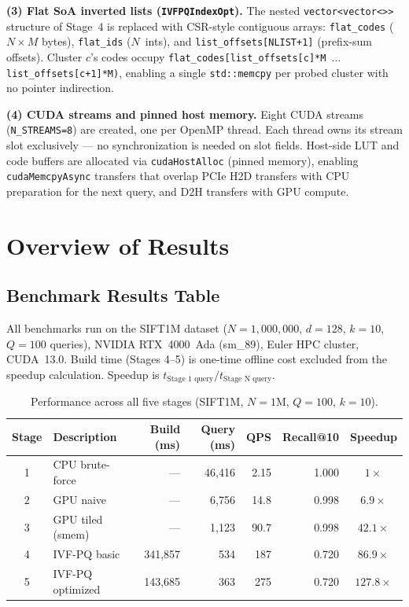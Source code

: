\documentclass[12pt]{article}
\newcommand{\code}[1]{\texttt{\small #1}}
\begin{document}
\textbf{(3) Flat SoA inverted lists (\code{IVFPQIndexOpt}).}
The nested \code{vector<vector<>>} structure of Stage~4 is replaced with
CSR-style contiguous arrays: \code{flat\_codes} ($N \times M$ bytes),
\code{flat\_ids} ($N$~ints), and \code{list\_offsets[NLIST+1]}
(prefix-sum offsets).
Cluster $c$'s codes occupy
\code{flat\_codes[list\_offsets[c]*M $\ldots$ list\_offsets[c+1]*M)},
enabling a single \code{std::memcpy} per probed cluster with no pointer
indirection.

\textbf{(4) CUDA streams and pinned host memory.}
Eight CUDA streams (\code{N\_STREAMS=8}) are created, one per OpenMP thread.
Each thread owns its stream slot exclusively --- no synchronization is needed
on slot fields.
Host-side LUT and code buffers are allocated via \code{cudaHostAlloc}
(pinned memory), enabling \code{cudaMemcpyAsync} transfers that overlap
PCIe H2D transfers with CPU preparation for the next query, and D2H transfers
with GPU compute.

\section{Overview of Results}

\subsection{Benchmark Results Table}

All benchmarks run on the SIFT1M dataset ($N{=}1{,}000{,}000$, $d{=}128$,
$k{=}10$, $Q{=}100$ queries), NVIDIA RTX~4000~Ada (sm\_89), Euler HPC cluster,
CUDA~13.0. Build time (Stages 4--5) is one-time offline cost excluded from the
speedup calculation. Speedup is $t_{\text{Stage 1 query}} / t_{\text{Stage N query}}$.

\begin{table}[h]
\centering
\caption{Performance across all five stages (SIFT1M, $N{=}1\text{M}$, $Q{=}100$, $k{=}10$).}
\label{tab:results}
\renewcommand{\arraystretch}{1.35}
\begin{tabular}{clrrrrc}
\toprule
\textbf{Stage} & \textbf{Description}
  & \textbf{Build (ms)} & \textbf{Query (ms)}
  & \textbf{QPS} & \textbf{Recall@10} & \textbf{Speedup} \\
\midrule
1 & CPU brute-force   & ---         & 46{,}416 &   2.15 & 1.000 & $1\times$       \\
2 & GPU naive         & ---         &  6{,}756 &  14.8  & 0.998 & $6.9\times$     \\
3 & GPU tiled (smem)  & ---         &  1{,}123 &  90.7  & 0.998 & $42.1\times$    \\
4 & IVF-PQ basic      & 341{,}857   &    534   & 187    & 0.720 & $86.9\times$    \\
5 & IVF-PQ optimized  & 143{,}685   &    363   & 275    & 0.720 & $127.8\times$   \\
\bottomrule
\end{tabular}
\end{table}
\end{document}
